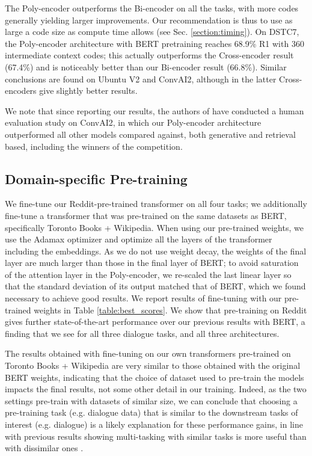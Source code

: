 \documentclass{article} \usepackage{iclr2020_conference,times}
\begin{document}
The Poly-encoder outperforms the Bi-encoder on all the tasks, with more codes generally yielding larger improvements.  Our recommendation is thus to use as large a code size as compute time allows
(see Sec. \ref{section:timing}).
On DSTC7, the Poly-encoder architecture with BERT pretraining
reaches 68.9\% R1 with 360 intermediate context codes; this actually outperforms the Cross-encoder result (67.4\%) and is noticeably better than our Bi-encoder result (66.8\%).
Similar conclusions are found on Ubuntu V2 and ConvAI2, although in the latter Cross-encoders
give slightly better results.




We note that since reporting our results, the authors of \citet{li2019acute} have conducted a human evaluation study on ConvAI2, in which our Poly-encoder architecture outperformed all other models compared against, both generative and retrieval based, including the winners of the competition.





\subsection{Domain-specific Pre-training}
\label{section:domainspepretraining}

We fine-tune our Reddit-pre-trained transformer on all four tasks; we additionally fine-tune a transformer that was pre-trained on the same datasets as BERT, specifically Toronto Books + Wikipedia. 
When using our pre-trained weights, we use the Adamax optimizer and optimize all the layers of the transformer including the embeddings. As we do not use weight decay, the weights of the final layer are much larger than those in the final layer of BERT; to avoid saturation of the attention layer in the Poly-encoder, we re-scaled the last linear layer so that the standard deviation of its output matched that of BERT, which we found necessary to achieve good results.
We report results of fine-tuning with our pre-trained weights in Table \ref{table:best_scores}. We show that pre-training on Reddit gives further state-of-the-art performance over our previous results with BERT, a finding that we see for {all} three dialogue tasks, and {all} three architectures. 

The results obtained with fine-tuning on our own transformers pre-trained on Toronto Books + Wikipedia are very similar to those obtained with the original BERT weights, indicating that the choice of dataset used to pre-train the models impacts the final results, not some other detail in our training.
 Indeed, as the two settings pre-train with datasets of similar size, we can conclude that choosing a pre-training task (e.g. dialogue data) that is similar to the downstream tasks of interest (e.g. dialogue) is a likely explanation for these performance gains, in line with previous results showing multi-tasking with similar tasks is more useful than with dissimilar ones \citep{caruana1997multitask}.
\end{document}
